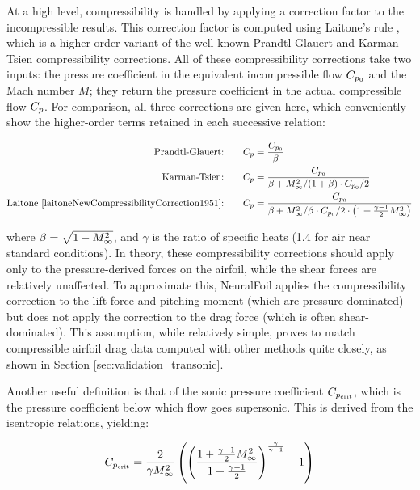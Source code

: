 \documentclass[journal]{new-aiaa}
\begin{document}
At a high level, compressibility is handled by applying a correction factor to the incompressible results. This correction factor is computed using Laitone's rule \cite{laitoneNewCompressibilityCorrection1951}, which is a higher-order variant of the well-known Prandtl-Glauert and Karman-Tsien compressibility corrections. All of these compressibility corrections take two inputs: the pressure coefficient in the equivalent incompressible flow $C_{p_0}$ and the Mach number $M$; they return the pressure coefficient in the actual compressible flow $C_p$. For comparison, all three corrections are given here, which conveniently show the higher-order terms retained in each successive relation:

\begin{align}
    \label{eq:prandtl-glauert} \text{Prandtl-Glauert:} \qquad        & C_p = \frac{C_{p_0}}{\beta}                                                                                    \\
    \label{eq:karman-tsien} \text{Karman-Tsien:}\qquad               & C_p = \frac{C_{p_0}}{\beta + M_\infty^2 / (1 + \beta) \cdot C_{p_0} / 2}                                               \\
    \label{eq:laitone} \text{Laitone \cite{laitoneNewCompressibilityCorrection1951}:}\qquad & C_p = \frac{C_{p_0}}{\beta + M_\infty^2 / \beta \cdot C_{p_0} / 2 \cdot \left( 1 + \frac{\gamma - 1}{2} M_\infty^2 \right)}
\end{align}

\noindent where $\beta = \sqrt{1- M_\infty^2}$, and $\gamma$ is the ratio of specific heats (1.4 for air near standard conditions). In theory, these compressibility corrections should apply only to the pressure-derived forces on the airfoil, while the shear forces are relatively unaffected. To approximate this, NeuralFoil applies the compressibility correction to the lift force and pitching moment (which are pressure-dominated) but does not apply the correction to the drag force (which is often shear-dominated). This assumption, while relatively simple, proves to match compressible airfoil drag data computed with other methods quite closely, as shown in Section \ref{sec:validation_transonic}.

Another useful definition is that of the sonic pressure coefficient $C_{p_{\rm crit}}$, which is the pressure coefficient below which flow goes supersonic. This is derived from the isentropic relations, yielding:

\begin{equation}
    C_{p_{\rm crit}} = \frac{2}{\gamma M_\infty^{2}} \left(
    \left(
    \frac{1 + \frac{\gamma - 1}{2} M_\infty^{2}}{1 + \frac{\gamma - 1}{2}}
    \right)^{\frac{\gamma}{\gamma - 1}}
    - 1
    \right)
    \label{eq:sonic-pressure-coefficient}
\end{equation}
\end{document}
